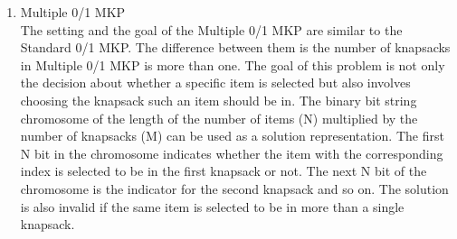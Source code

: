 \documentclass[12pt,oneside,openright,a4paper]{cpe-english-project}
\begin{document}
\begin{enumerate}
	\begin{minipage}[c]{\textwidth}\centering
	[Example of Chromosome Representation of the Standard Knapsack Solution]{Example of Chromosome Representation of the Standard Knapsack Solution \cite{arpit2022}}
	\label{fig:theory-knapsack-chromosome}
	\end{minipage}
	Since there are four items, the binary bit string chromosome with a length of four can be used as an encoded representation of the solution. Figure~\ref{fig:theory-knapsack-chromosome} demonstrates the chromosome with the value of 1, 0, 0, and 1. By decoding these values, we get the solution which is picking items A and D into a knapsack. Using encoding and decoding this way, we can represent any solution using the binary bit string; and we can finally use a Genetic Algorithm to solve such a problem.\\

	\item Multiple 0/1 MKP \\
	The setting and the goal of the Multiple 0/1 MKP are similar to the Standard 0/1 MKP. The difference between them is the number of knapsacks in Multiple 0/1 MKP is more than one. The goal of this problem is not only the decision about whether a specific item is selected but also involves choosing the knapsack such an item should be in. The binary bit string chromosome of the length of the number of items (N) multiplied by the number of knapsacks (M) can be used as a solution representation. The first N bit in the chromosome indicates whether the item with the corresponding index is selected to be in the first knapsack or not. The next N bit of the chromosome is the indicator for the second knapsack and so on. The solution is also invalid if the same item is selected to be in more than a single knapsack.	
\end{enumerate}
\end{document}
